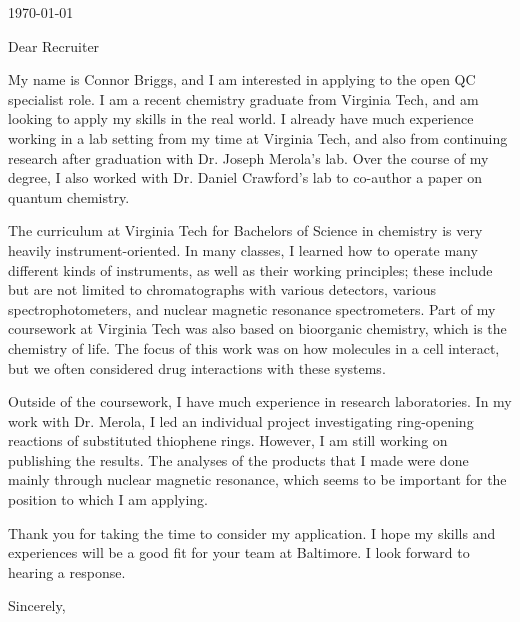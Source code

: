 \documentclass[12pt]{letter}
\begin{document}
\begin{letter}{\today}

  \opening{Dear Recruiter}

   My name is Connor Briggs, and I am interested in applying to the open QC specialist role. I am a recent chemistry graduate from Virginia Tech, and am looking to apply my skills in the real world. I already have much experience working in a lab setting from my time at Virginia Tech, and also from continuing research after graduation with Dr. Joseph Merola's lab. Over the course of my degree, I also worked with Dr. Daniel Crawford's lab to co-author a paper on quantum chemistry.
  
  
   The curriculum at Virginia Tech for Bachelors of Science in chemistry is very heavily instrument-oriented. In many classes, I learned how to operate many different kinds of instruments, as well as their working principles; these include but are not limited to chromatographs with various detectors, various spectrophotometers, and nuclear magnetic resonance spectrometers. Part of my coursework at Virginia Tech was also based on bioorganic chemistry, which is the chemistry of life. The focus of this work was on how molecules in a cell interact, but we often considered drug interactions with these systems.

   Outside of the coursework, I have much experience in research laboratories. In my work with Dr. Merola, I led an individual project investigating ring-opening reactions of substituted thiophene rings. However, I am still working on publishing the results. The analyses of the products that I made were done mainly through nuclear magnetic resonance, which seems to be important for the position to which I am applying.


  Thank you for taking the time to consider my application. I hope my skills and experiences will be a good fit for your team at Baltimore. I look forward to hearing a response.
\closing{Sincerely,}
  
\end{letter}
\end{document}
